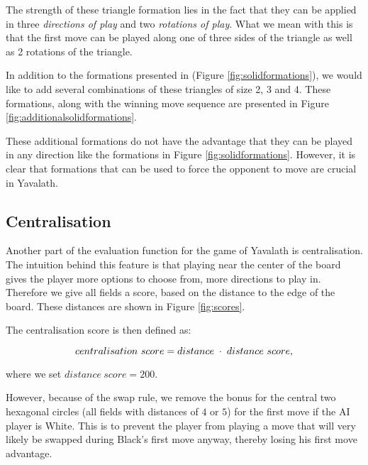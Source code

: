 \documentclass[11pt]{article}
\begin{document}


The strength of these triangle formation lies in the fact that they can be applied in three \emph{directions of play} and two \emph{rotations of play}. What we mean with this is that the first move can be played along one of three sides of the triangle as well as 2 rotations of the triangle.

In addition to the formations presented in \cite{browne2011evolutionary} (Figure \ref{fig:solidformations}), we would like to add several combinations of these triangles of size 2, 3 and 4. These formations, along with the winning move sequence are presented in Figure \ref{fig:additionalsolidformations}.



These additional formations do not have the advantage that they can be played in any direction like the formations in Figure \ref{fig:solidformations}. However, it is clear that formations that can be used to force the opponent to move are crucial in Yavalath.

\subsection{Centralisation}
\label{-subsec:centralisation}
Another part of the evaluation function for the game of Yavalath is centralisation. The intuition behind this feature is that playing near the center of the board gives the player more options to choose from, \ie more directions to play in. Therefore we give all fields a score, based on the distance to the edge of the board. These distances are shown in Figure \ref{fig:scores}. 



The centralisation score is then defined as:

\begin{equation}
	centralisation\ score = distance \;\cdot\; distance\ score,
\end{equation}

where we set $distance\ score = 200$.

However, because of the swap rule, we remove the bonus for the central two hexagonal circles (all fields with distances of $4$ or $5$) for the first move if the AI player is White. This is to prevent the player from playing a move that will very likely be swapped during Black's first move anyway, thereby losing his first move advantage.
\end{document}
